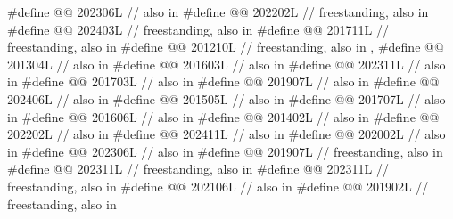 \begin{codeblock}
#define @@                               202306L // also in 
#define @@          202202L // freestanding, also in 
#define @@                 202403L // freestanding, also in 
#define @@                      201711L // freestanding, also in 
#define @@                  201210L
  // freestanding, also in , 
#define @@       201304L // also in 
#define @@                            201603L // also in 
#define @@             202311L // also in 
#define @@                       201703L // also in 
#define @@                         201907L // also in 
#define @@                           202406L // also in 
#define @@                      201505L // also in 
#define @@                 201707L // also in 
#define @@              201606L // also in 
#define @@                201402L // also in 
#define @@                             202202L // also in 
#define @@                              202411L // also in 
#define @@           202002L // also in 
#define @@          202306L // also in 
#define @@                   201907L // freestanding, also in 
#define @@                              202311L // freestanding, also in 
#define @@             202311L // freestanding, also in 
#define @@                        202106L // also in 
#define @@                             201902L // freestanding, also in 

\end{codeblock}
